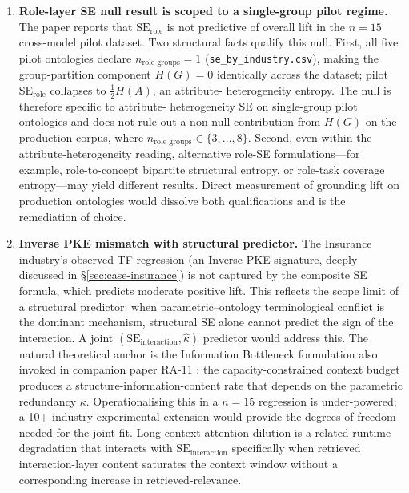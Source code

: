 \documentclass[11pt,a4paper]{article}
\newcommand{\se}{\mathrm{SE}}
\newcommand{\serole}{\se_{\text{role}}}
\newcommand{\seint}{\se_{\text{interaction}}}
\newcommand{\kapp}{\kappa}
\begin{document}
\begin{enumerate}[leftmargin=2em]
    predictions would shift marginally.
  \item \textbf{Role-layer SE null result is scoped to a single-group
    pilot regime.} The paper reports that $\serole$ is not predictive
    of overall lift in the $n=15$ cross-model pilot dataset. Two
    structural facts qualify this null. First, all five pilot
    ontologies declare $n_{\text{role groups}} = 1$
    (\texttt{se\_by\_industry.csv}), making the group-partition
    component $H(G) = 0$ identically across the dataset; pilot
    $\serole$ collapses to $\tfrac{1}{2}H(A)$, an attribute-
    heterogeneity entropy. The null is therefore specific to attribute-
    heterogeneity SE on single-group pilot ontologies and does not
    rule out a non-null contribution from $H(G)$ on the production
    corpus, where $n_{\text{role groups}} \in \{3,\ldots,8\}$. Second,
    even within the attribute-heterogeneity reading, alternative
    role-SE formulations---for example, role-to-concept bipartite
    structural entropy, or role-task coverage entropy---may yield
    different results. Direct measurement of grounding lift on
    production ontologies would dissolve both qualifications and is
    the remediation of choice.
  \item \textbf{Inverse PKE mismatch with structural predictor.} The
    Insurance industry's observed TF regression (an Inverse PKE
    signature, deeply discussed in \S\ref{sec:case-insurance}) is not
    captured by the composite SE formula, which predicts moderate
    positive lift. This reflects the scope limit of a structural
    predictor: when parametric--ontology terminological conflict is
    the dominant mechanism, structural SE alone cannot predict the
    sign of the interaction. A joint $(\seint, \hat{\kapp})$ predictor
    would address this. The natural theoretical anchor is the
    Information Bottleneck \citep{tishby2015deep} formulation also
    invoked in companion paper RA-11 \citep{luong2026quantum}: the
    capacity-constrained context budget produces a
    structure-information-content rate that depends on the parametric
    redundancy $\kapp$. Operationalising this in a $n=15$ regression
    is under-powered; a 10+-industry experimental extension would
    provide the degrees of freedom needed for the joint fit.
    Long-context attention dilution \citep{liu2024lost} is a related
    runtime degradation that interacts with $\seint$ specifically
    when retrieved interaction-layer content saturates the context
    window without a corresponding increase in retrieved-relevance.
\end{enumerate}
\end{document}

